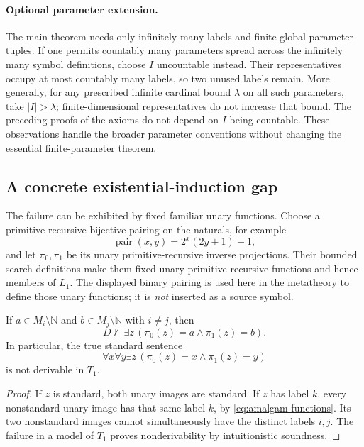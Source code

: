 \paragraph{Optional parameter extension.}
The main theorem needs only infinitely many labels and finite global
parameter tuples. If one permits countably many parameters spread
across the infinitely many symbol definitions, choose $I$ uncountable
instead. Their representatives occupy at most countably many labels,
so two unused labels remain. More generally, for any prescribed
infinite cardinal bound $\lambda$ on all such parameters, take
$|I|>\lambda$; finite-dimensional representatives do not increase
that bound. The preceding proofs of the axioms do not depend on
$I$ being countable. These observations handle the broader parameter
conventions without changing the essential finite-parameter theorem.

\subsection{A concrete existential-induction gap}
\label{subsec:amalgam-pairing}

The failure can be exhibited by fixed familiar unary functions.
Choose a primitive-recursive bijective pairing on the naturals, for
example
\[
          \operatorname{pair}(x,y)=2^x(2y+1)-1,
\]
and let $\pi_0,\pi_1$ be its unary primitive-recursive inverse
projections. Their bounded search definitions make them fixed unary
primitive-recursive functions and hence members of $L_1$.
The displayed binary pairing is used here in the metatheory to define
those unary functions; it is \emph{not} inserted as a source symbol.

\begin{proposition}
\label{prop:amalgam-no-pair}
If $a\in M_i\setminus\mathbb N$ and
$b\in M_j\setminus\mathbb N$ with $i\ne j$, then
\[
 D\not\models\exists z\,
              (\pi_0(z)=a\wedge\pi_1(z)=b).
 \tag{NoPair}\label{eq:amalgam-no-pair}
\]
In particular, the true standard sentence
\[
 \forall x\forall y\exists z\,
              (\pi_0(z)=x\wedge\pi_1(z)=y)
 \tag{PairTot}\label{eq:amalgam-pairtot}
\]
is not derivable in $T_1$.
\end{proposition}
\begin{proof}
If $z$ is standard, both unary images are standard. If $z$ has
label $k$, every nonstandard unary image has that same label $k$,
by \eqref{eq:amalgam-functions}. Its two nonstandard images cannot
simultaneously have the distinct labels $i,j$. The failure in a
model of $T_1$ proves nonderivability by intuitionistic soundness.
\end{proof}

